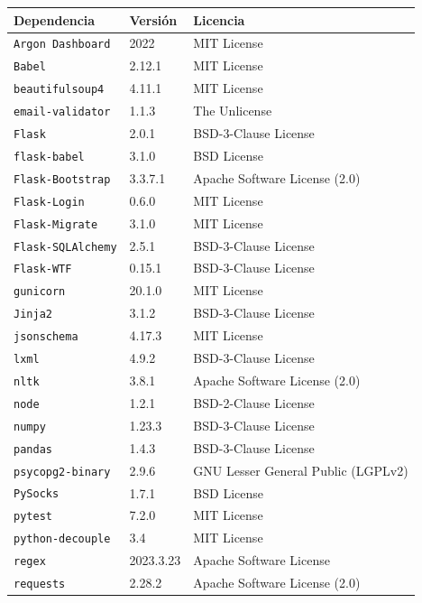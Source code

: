 \begin{table}[p]
	\centering
	\begin{tabularx}{\linewidth}{ p{} p{} p{} }
		\toprule
		\textbf{Dependencia} & \textbf{Versión} & \textbf{Licencia} \\
		\midrule
		\texttt{Argon Dashboard} & 2022 & MIT License\\
		\texttt{Babel} & 2.12.1 & MIT License\\
		\texttt{beautifulsoup4} & 4.11.1 & MIT License \\
		\texttt{email-validator} & 1.1.3 & The Unlicense \\
		\texttt{Flask} & 2.0.1 & BSD-3-Clause License\\
		\texttt{flask-babel} & 3.1.0 & BSD License\\
		\texttt{Flask-Bootstrap} & 3.3.7.1 & Apache Software License (2.0)\\
		\texttt{Flask-Login} & 0.6.0 & MIT License \\
		\texttt{Flask-Migrate} & 3.1.0 & MIT License \\
		\texttt{Flask-SQLAlchemy} & 2.5.1 & BSD-3-Clause License \\
		\texttt{Flask-WTF} & 0.15.1 & BSD-3-Clause License \\
		\texttt{gunicorn} & 20.1.0 & MIT License \\
		\texttt{Jinja2} & 3.1.2 & BSD-3-Clause License \\
		\texttt{jsonschema} & 4.17.3 & MIT License \\
		\texttt{lxml} & 4.9.2 & BSD-3-Clause License \\
		\texttt{nltk} & 3.8.1 & Apache Software License (2.0)\\
		\texttt{node} & 1.2.1 & BSD-2-Clause License\\
		\texttt{numpy} & 1.23.3 & BSD-3-Clause License \\
		\texttt{pandas} & 1.4.3 & BSD-3-Clause License \\
		\texttt{psycopg2-binary} & 2.9.6 & GNU Lesser General Public (LGPLv2) \\
		\texttt{PySocks} & 1.7.1 & BSD License \\
		\texttt{pytest} & 7.2.0 & MIT License \\
		\texttt{python-decouple} & 3.4 & MIT License \\
		\texttt{regex} & 2023.3.23 & Apache Software License  \\
		\texttt{requests} & 2.28.2 & Apache Software License (2.0) \\

\end{tabularx}
\end{table}
